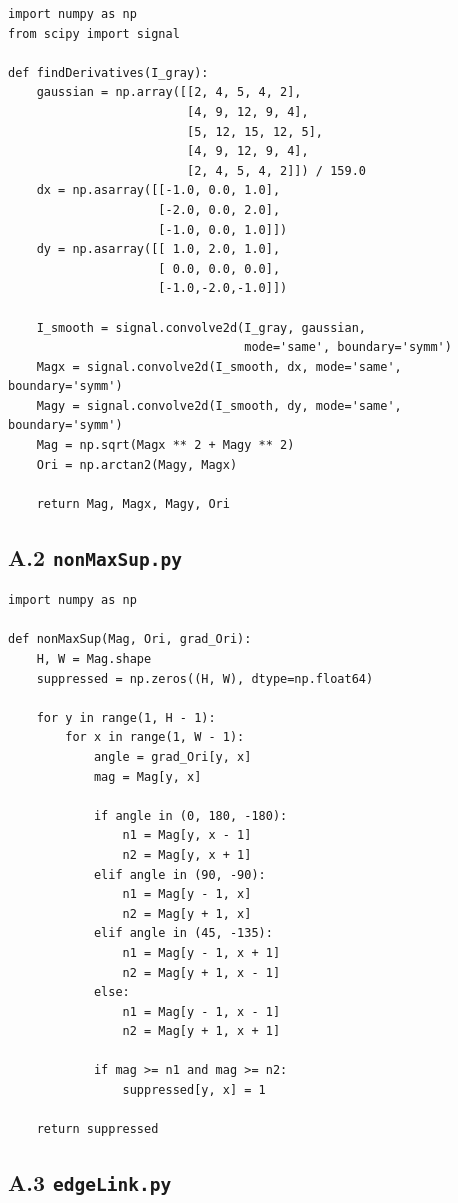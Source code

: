 \documentclass[12pt,a4paper]{ctexart}
\begin{document}
\begin{lstlisting}
import numpy as np
from scipy import signal

def findDerivatives(I_gray):
    gaussian = np.array([[2, 4, 5, 4, 2],
                         [4, 9, 12, 9, 4],
                         [5, 12, 15, 12, 5],
                         [4, 9, 12, 9, 4],
                         [2, 4, 5, 4, 2]]) / 159.0
    dx = np.asarray([[-1.0, 0.0, 1.0],
                     [-2.0, 0.0, 2.0],
                     [-1.0, 0.0, 1.0]])
    dy = np.asarray([[ 1.0, 2.0, 1.0],
                     [ 0.0, 0.0, 0.0],
                     [-1.0,-2.0,-1.0]])

    I_smooth = signal.convolve2d(I_gray, gaussian,
                                 mode='same', boundary='symm')
    Magx = signal.convolve2d(I_smooth, dx, mode='same', boundary='symm')
    Magy = signal.convolve2d(I_smooth, dy, mode='same', boundary='symm')
    Mag = np.sqrt(Magx ** 2 + Magy ** 2)
    Ori = np.arctan2(Magy, Magx)

    return Mag, Magx, Magy, Ori
\end{lstlisting}

\subsection*{A.2 \texttt{nonMaxSup.py}}

\begin{lstlisting}
import numpy as np

def nonMaxSup(Mag, Ori, grad_Ori):
    H, W = Mag.shape
    suppressed = np.zeros((H, W), dtype=np.float64)

    for y in range(1, H - 1):
        for x in range(1, W - 1):
            angle = grad_Ori[y, x]
            mag = Mag[y, x]

            if angle in (0, 180, -180):
                n1 = Mag[y, x - 1]
                n2 = Mag[y, x + 1]
            elif angle in (90, -90):
                n1 = Mag[y - 1, x]
                n2 = Mag[y + 1, x]
            elif angle in (45, -135):
                n1 = Mag[y - 1, x + 1]
                n2 = Mag[y + 1, x - 1]
            else:
                n1 = Mag[y - 1, x - 1]
                n2 = Mag[y + 1, x + 1]

            if mag >= n1 and mag >= n2:
                suppressed[y, x] = 1

    return suppressed
\end{lstlisting}

\subsection*{A.3 \texttt{edgeLink.py}}
\end{document}

